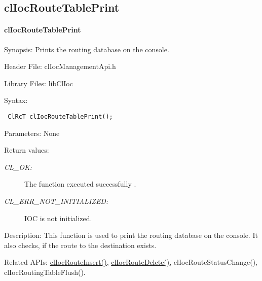 \begin{flushleft}
\newpage



\subsection{clIocRouteTablePrint}
\hypertarget{pageIOC206}{}\paragraph{cl\-Ioc\-Route\-Table\-Print}\label{pageIOC206}
\begin{Desc}
\item[Synopsis:]Prints the routing database on the console.\end{Desc}
\begin{Desc}
\item[Header File:]clIocManagementApi.h\end{Desc}
\begin{Desc}
\item[Library Files:]libClIoc\end{Desc}
\begin{Desc}
\item[Syntax:]

\footnotesize\begin{verbatim} ClRcT clIocRouteTablePrint();
\end{verbatim}
\normalsize
\end{Desc}
\begin{Desc}
\item[Parameters:]None\end{Desc}
\begin{Desc}
\item[Return values:]
\begin{description}
\item[{\em CL\_\-OK:}]The function executed successfully . 
\item[{\em CL\_\-ERR\_\-NOT\_\-INITIALIZED:}]IOC is not initialized.\end{description}
\end{Desc}
\begin{Desc}
\item[Description:]This function is used to print the routing database on the console. It also checks, if the route to the 
destination exists.\end{Desc}
\begin{Desc}
\item[Related APIs:]\hyperlink{pageioc203}{clIocRouteInsert()}, \hyperlink{pageioc204}{clIocRouteDelete()}, 
clIocRouteStatusChange(), clIocRoutingTableFlush(). \end{Desc}
\newpage






\end{flushleft}
